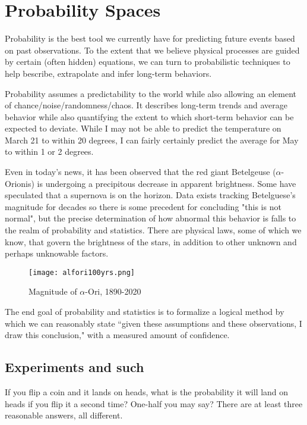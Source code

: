 \documentclass[../main.tex]{subfiles}
\begin{document}
\chapter{Probability Spaces}

Probability is the best tool we currently have for predicting
future events based on past observations. To the extent that we believe physical processes are guided by certain (often hidden) equations, we can turn to probabilistic techniques to help bescribe, extrapolate and infer long-term behaviors.

Probability assumes a predictability to the world while also allowing an element of chance/noise/randomness/chaos. It describes long-term
trends and average behavior while also quantifying the extent to
which short-term behavior can be expected to deviate. While I may not
be able to predict the temperature on March 21 to within 20 degrees, I can fairly certainly predict the average for May to within 1 or 2 degrees.

Even in today's news, it has been observed that the red giant
Betelgeuse ($\alpha$-Orionis) is undergoing a precipitous decrease
in apparent brightness. Some have speculated that a supernova
is on the horizon. Data exists tracking Betelguese's magnitude
for decades so there is some precedent for concluding "this is
not normal", but the precise determination of how abnormal
this behavior is falls to the realm of probability and
statistics. There are physical laws, some of which we know,
that govern the brightness of the stars, in addition to other
unknown and perhaps unknowable factors.
\begin{figure}
	\centering
	\texttt{[image: alfori100yrs.png]}
	\caption{Magnitude of $\alpha$-Ori, 1890-2020}
	\label{fig:alfori100yrs}
\end{figure}

The end goal of probability and statistics is to formalize a
logical method by which we can reasonably state ``given these
assumptions and these observations, I draw this conclusion,"
with a measured amount of confidence.

\section{Experiments and such}
If you flip a coin and it lands on heads, what is the probability it 
will land on heads if you flip it a second time? One-half you may say?
There are at least three reasonable answers, all different.
\end{document}
